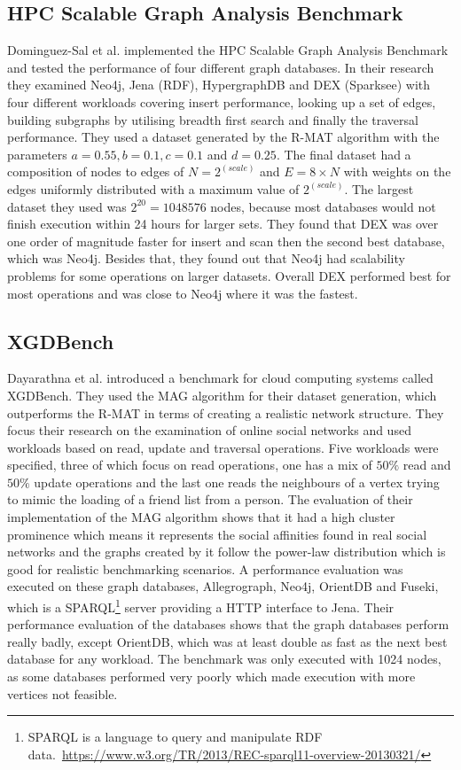 \subsection{HPC Scalable Graph Analysis Benchmark}
Dominguez-Sal et al. implemented the HPC Scalable Graph Analysis Benchmark and tested the performance of four different graph databases.
In their research they examined Neo4j, Jena (RDF), HypergraphDB and DEX (Sparksee) with four different workloads covering insert performance, looking up a set of edges, building subgraphs by utilising breadth first search and finally the traversal performance.
They used a dataset generated by the R-MAT algorithm with the parameters $ a = 0.55, b = 0.1, c = 0.1 $ and $ d = 0.25 $.
The final dataset had a composition of nodes to edges of $ N = 2^(scale) $ and $ E = 8 \times N $ with weights on the edges uniformly distributed with a maximum value of $ 2^(scale) $.
The largest dataset they used was $ 2^20 = 1048576 $ nodes,
because most databases would not finish execution within 24 hours for larger sets.
They found that DEX was over one order of magnitude faster for insert and scan then the second best database,
which was Neo4j.
Besides that,
they found out that Neo4j had scalability problems for some operations on larger datasets.
Overall DEX performed best for most operations and was close to Neo4j where it was the fastest.~\cite{TaoShen}

\subsection{XGDBench}
Dayarathna et al. introduced a benchmark for cloud computing systems called XGDBench.
They used the MAG algorithm for their dataset generation,
which outperforms the R-MAT in terms of creating a realistic network structure.
They focus their research on the examination of online social networks and used workloads based on read, update and traversal operations.
Five workloads were specified, three of which focus on read operations, one has a mix of $ 50\% $ read and $ 50\% $ update operations and the last one reads the neighbours of a vertex trying to mimic the loading of a friend list from a person.
The evaluation of their implementation of the MAG algorithm shows that it had a high cluster prominence which means it represents the social affinities found in real social networks and the graphs created by it follow the power-law distribution which is good for realistic benchmarking scenarios.
A performance evaluation was executed on these graph databases,
Allegrograph, Neo4j, OrientDB and Fuseki,
which is a SPARQL\footnote{SPARQL is a language to query and manipulate RDF data.~\url{https://www.w3.org/TR/2013/REC-sparql11-overview-20130321/}} server providing a HTTP interface to Jena.
Their performance evaluation of the databases shows that the graph databases perform really badly,
except OrientDB,
which was at least double as fast as the next best database for any workload.
The benchmark was only executed with 1024 nodes,
as some databases performed very poorly which made execution with more vertices not feasible.~\cite{Dayarathna2012}

